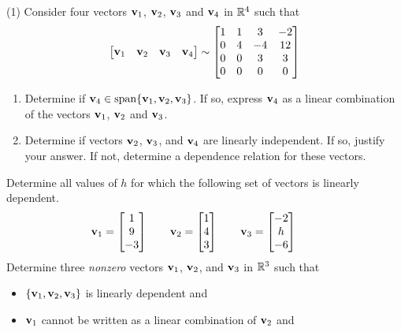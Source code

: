 \begin{tasks}[resume, style=enumerate](1)
\task
  Consider four vectors $\mathbf v_1$, $\mathbf v_2$, $\mathbf v_3$ and $\mathbf v_4$ in
  $\mathbb R^4$ such that
  \begin{align*}
    \begin{bmatrix}
      \mathbf v_1 & \mathbf v_2 & \mathbf v_3 & \mathbf v_4
    \end{bmatrix}
    \sim
    \begin{bmatrix}
      1 & 1 & 3 & -2 \\
      0 & 4 & -4 & 12 \\
      0 & 0 & 3 & 3 \\
      0 & 0 & 0 & 0
    \end{bmatrix}
  \end{align*}
  \begin{enumerate}[label=(\alph*)]
  \item
    Determine if $\mathbf v_4 \in \operatorname{\mathrm{span}}\{\mathbf v_1, \mathbf v_2, \mathbf v_3\}$.  If so,
    express $\mathbf v_4$ as a linear combination of the vectors $\mathbf v_1$,
    $\mathbf v_2$ and $\mathbf v_3$.
  \item Determine if vectors $\mathbf v_2$, $\mathbf v_3$, and $\mathbf v_4$ are linearly
    independent.  If so, justify your answer.  If not, determine a
    dependence relation for these vectors.
  \end{enumerate}
\task
  Determine all values of $h$ for which the following set of vectors
  is linearly dependent.
  \begin{align*}
    \mathbf v_1 =
    \begin{bmatrix} 1 \\ 9 \\ -3 \end{bmatrix}
    \qquad
    \mathbf v_2 =
    \begin{bmatrix} 1 \\ 4 \\ 3 \end{bmatrix}
    \qquad
    \mathbf v_3 =
    \begin{bmatrix} -2 \\ h \\ -6 \end{bmatrix}
    \qquad
  \end{align*}
\task
  Determine three \textit{nonzero} vectors $\mathbf v_1$, $\mathbf v_2$, and
  $\mathbf v_3$ in $\mathbb R^3$ such that
  \begin{itemize}
  \item
    $\{\mathbf v_1, \mathbf v_2, \mathbf v_3\}$ is linearly dependent and
  \item
    $\mathbf v_1$ cannot be written as a linear combination of $\mathbf v_2$ and

\end{itemize}
\end{tasks}
